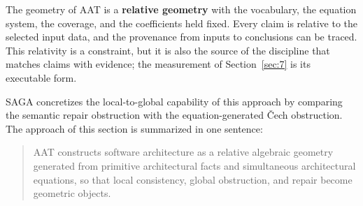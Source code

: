 The geometry of AAT is a \textbf{relative geometry} with the vocabulary,
the equation system, the coverage, and the coefficients held fixed. Every
claim is relative to the selected input data, and the provenance from
inputs to conclusions can be traced. This relativity is a constraint, but
it is also the source of the discipline that matches claims with
evidence; the measurement of Section~\ref{sec:7} is its executable form.

SAGA concretizes the local-to-global capability of this approach by
comparing the semantic repair obstruction with the equation-generated
\v{C}ech obstruction. The approach of this section is summarized in one
sentence:

\begin{quote}
AAT constructs software architecture as a relative algebraic geometry
generated from primitive architectural facts and simultaneous
architectural equations, so that local consistency, global obstruction,
and repair become geometric objects.
\end{quote}
